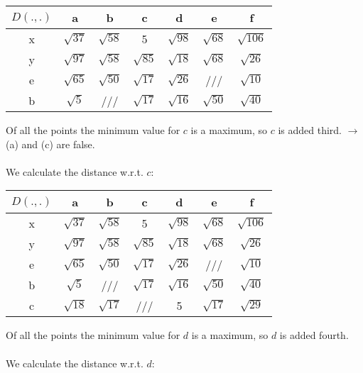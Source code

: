 \documentclass[11pt,a4paper,oneside]{article}
\begin{document}
\begin{table}[H]
\centering
\def\arraystretch{1.2}
\begin{tabular}{|c|c|c|c|c|c|c|}
\hline 
$D(.,.)$ & a & b & c & d & e & f \\ 
\hline 
x & $\sqrt{37}$ & $\sqrt{58}$ & 5 & $\sqrt{98}$ & $\sqrt{68}$ & $\sqrt{106}$ \\ 
\hline 
y & $\sqrt{97}$ & $\sqrt{58}$ & $\sqrt{85}$ & $\sqrt{18}$ & $\sqrt{68}$ & $\sqrt{26}$ \\ 
\hline
e & $\sqrt{65}$ & $\sqrt{50}$ & $\sqrt{17}$ & $\sqrt{26}$ & /// & $\sqrt{10}$ \\
\hline
b & $\sqrt{5}$ & /// & $\sqrt{17}$ & $\sqrt{16}$ & $\sqrt{50}$ & $\sqrt{40}$ \\
\hline 
\end{tabular} 
\end{table}
\noindent
Of all the points the minimum value for $c$ is a maximum, so $c$ is added third. $\rightarrow$ (a) and (c) are false.
\\
\\
We calculate the distance w.r.t. $c$:

\begin{table}[H]
\centering
\def\arraystretch{1.2}
\begin{tabular}{|c|c|c|c|c|c|c|}
\hline 
$D(.,.)$ & a & b & c & d & e & f \\ 
\hline 
x & $\sqrt{37}$ & $\sqrt{58}$ & 5 & $\sqrt{98}$ & $\sqrt{68}$ & $\sqrt{106}$ \\ 
\hline 
y & $\sqrt{97}$ & $\sqrt{58}$ & $\sqrt{85}$ & $\sqrt{18}$ & $\sqrt{68}$ & $\sqrt{26}$ \\ 
\hline
e & $\sqrt{65}$ & $\sqrt{50}$ & $\sqrt{17}$ & $\sqrt{26}$ & /// & $\sqrt{10}$ \\
\hline
b & $\sqrt{5}$ & /// & $\sqrt{17}$ & $\sqrt{16}$ & $\sqrt{50}$ & $\sqrt{40}$ \\
\hline 
c & $\sqrt{18}$ & $\sqrt{17}$ & /// & 5 & $\sqrt{17}$ & $\sqrt{29}$ \\
\hline 
\end{tabular} 
\end{table}
\noindent
Of all the points the minimum value for $d$ is a maximum, so $d$ is added fourth. 
\\
\\
We calculate the distance w.r.t. $d$:
\end{document}
